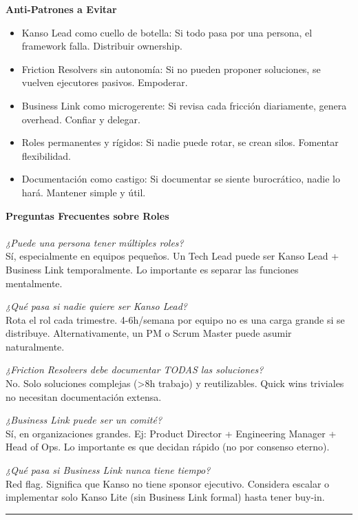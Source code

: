 \textbf{Anti-Patrones a Evitar}

\begin{itemize}
    \item Kanso Lead como cuello de botella: Si todo pasa por una persona, el framework falla. Distribuir ownership.
    \item Friction Resolvers sin autonomía: Si no pueden proponer soluciones, se vuelven ejecutores pasivos. Empoderar.
    \item Business Link como microgerente: Si revisa cada fricción diariamente, genera overhead. Confiar y delegar.
    \item Roles permanentes y rígidos: Si nadie puede rotar, se crean silos. Fomentar flexibilidad.
    \item Documentación como castigo: Si documentar se siente burocrático, nadie lo hará. Mantener simple y útil.
\end{itemize}

\textbf{Preguntas Frecuentes sobre Roles}
\\ 
\\ 
\textit{¿Puede una persona tener múltiples roles?}\\ 
Sí, especialmente en equipos pequeños. Un Tech Lead puede ser Kanso Lead + Business Link temporalmente. Lo importante es separar las funciones mentalmente.

\textit{¿Qué pasa si nadie quiere ser Kanso Lead?}\\ 
Rota el rol cada trimestre. 4-6h/semana por equipo no es una carga grande si se distribuye. Alternativamente, un PM o Scrum Master puede asumir naturalmente.

\textit{¿Friction Resolvers debe documentar TODAS las soluciones?}\\ 
No. Solo soluciones complejas (>8h trabajo) y reutilizables. Quick wins triviales no necesitan documentación extensa.

\textit{¿Business Link puede ser un comité?}\\ 
Sí, en organizaciones grandes. Ej: Product Director + Engineering Manager + Head of Ops. Lo importante es que decidan rápido (no por consenso eterno).

\textit{¿Qué pasa si Business Link nunca tiene tiempo?}\\ 
Red flag. Significa que Kanso no tiene sponsor ejecutivo. Considera escalar o implementar solo Kanso Lite (sin Business Link formal) hasta tener buy-in.
\\ 
\hrule
